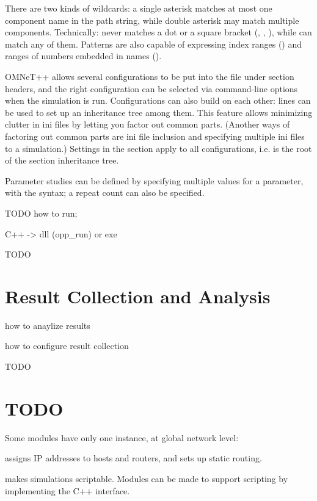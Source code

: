 There are two kinds of wildcards: a single asterisk \ttt{*} matches at most
one component name in the path string, while double asterisk \ttt{**} may
match multiple components. Technically: \ttt{*} never matches a dot or a
square bracket (, \ttt{[}, \ttt{]}), while \ttt{**} can match any of
them. Patterns are also capable of expressing index ranges
() and ranges of numbers embedded
in names ().

OMNeT++ allows several configurations to be put into the 
file under  section headers, and the right
configuration can be selected via command-line options when the simulation
is run. Configurations can also build on each other: 
lines can be used to set up an inheritance tree among them. This feature
allows minimizing clutter in ini files by letting you factor out common
parts. (Another ways of factoring out common parts are ini file inclusion
and specifying multiple ini files to a simulation.) Settings in the
\ttt{[General]} section apply to all configurations, i.e. \ttt{[General]}
is the root of the section inheritance tree.

Parameter studies can be defined by specifying multiple values for a
parameter, with the  syntax;
a repeat count can also be specified.

\ifdraft TODO
how to run;

C++ -> dll (opp\_run) or exe
\fi

\ifdraft TODO
\section{Result Collection and Analysis}

how to anaylize results

how to configure result collection
\fi


\ifdraft TODO
\section{TODO}
Some modules have only one instance, at global network level:

 assigns IP addresses to hosts and routers,
and sets up static routing.

 makes simulations scriptable. Modules can be made to support
scripting by implementing the  C++ interface.
\fi


